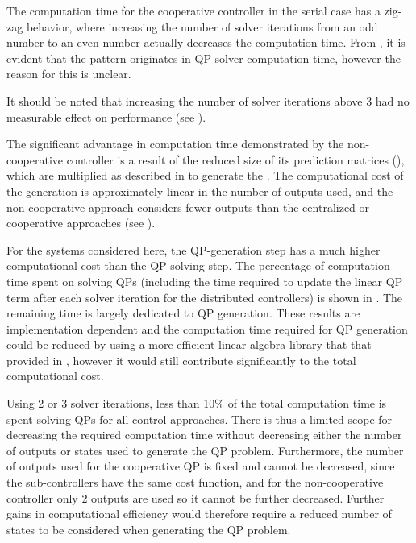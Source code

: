 The computation time for the cooperative controller in the serial case has a zig-zag behavior, where increasing the number of solver iterations from an odd number to an even number actually decreases the computation time.
From , it is evident that the pattern originates in QP solver computation time, however the reason for this is unclear.

It should be noted that increasing the number of solver iterations above 3 had no measurable effect on performance (see ).

The significant advantage in computation time demonstrated by the non-cooperative controller is a result of the reduced size of its prediction matrices (), which are multiplied as described in  to generate the .
The computational cost of the  generation is approximately linear in the number of outputs used, and the non-cooperative approach considers fewer outputs than the centralized or cooperative approaches (see ).

For the systems considered here, the QP-generation step has a much higher computational cost than the QP-solving step.
The percentage of computation time spent on solving QPs (including the time required to update the linear QP term after each solver iteration for the distributed controllers) is shown in .
The remaining time is largely dedicated to QP generation.
These results are implementation dependent and the computation time required for QP generation could be reduced by using a more efficient linear algebra library that that provided in \eigen{}, however it would still contribute significantly to the total computational cost.

Using 2 or 3 solver iterations, less than 10\% of the total computation time is spent solving QPs for all control approaches. 
There is thus a limited scope for decreasing the required computation time without decreasing either the number of outputs or states used to generate the QP problem.
Furthermore, the number of outputs used for the cooperative QP is fixed and cannot be decreased, since the sub-controllers have the same cost function, and for the non-cooperative controller only 2 outputs are used so it cannot be further decreased.
Further gains in computational efficiency would therefore require a reduced number of states to be considered when generating the QP problem.

